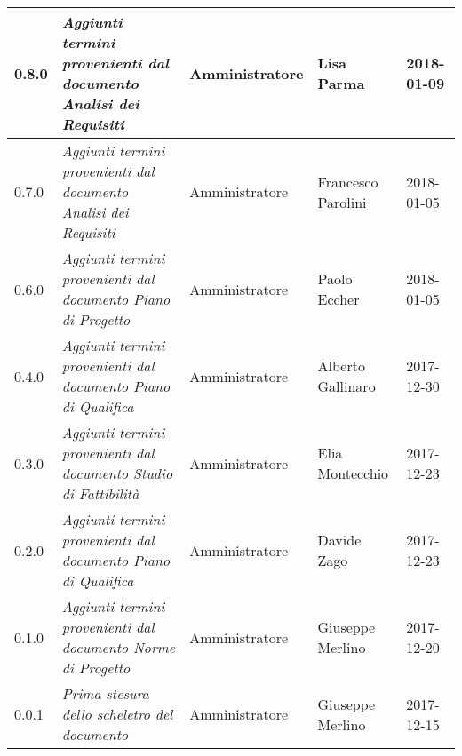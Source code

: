 \begin{table}[H]
\begin{tabular}{C{2cm}|C{4cm}|C{3cm}|C{3cm}|R{2cm}}
		0.8.0 & \emph{Aggiunti termini provenienti dal documento Analisi dei Requisiti} & Amministratore  & Lisa Parma & 2018-01-09 \\
		\hline
		
		0.7.0 & \emph{Aggiunti termini provenienti dal documento Analisi dei Requisiti} & Amministratore & Francesco Parolini & 2018-01-05 \\
		\hline
		
		0.6.0 & \emph{Aggiunti termini provenienti dal documento Piano di Progetto} & Amministratore & Paolo Eccher & 2018-01-05  \\
		\hline
		
		0.4.0 & \emph{Aggiunti termini provenienti dal documento Piano di Qualifica} & Amministratore & Alberto Gallinaro & 2017-12-30 \\
		\hline
		
		0.3.0 & \emph{Aggiunti termini provenienti dal documento Studio di Fattibilità} & Amministratore & Elia Montecchio & 2017-12-23 \\
		\hline
		
		0.2.0 & \emph{Aggiunti termini provenienti dal documento Piano di Qualifica}  & Amministratore & Davide Zago & 2017-12-23 \\
		\hline
		
		0.1.0 & \emph{Aggiunti termini provenienti dal documento Norme di Progetto}  & Amministratore & Giuseppe Merlino & 2017-12-20 \\
		\hline
		
		0.0.1 & \emph{Prima stesura dello scheletro del documento} & Amministratore  & Giuseppe Merlino & 2017-12-15   \\
		
	\end{tabular}
	
\end{table}


\clearpage